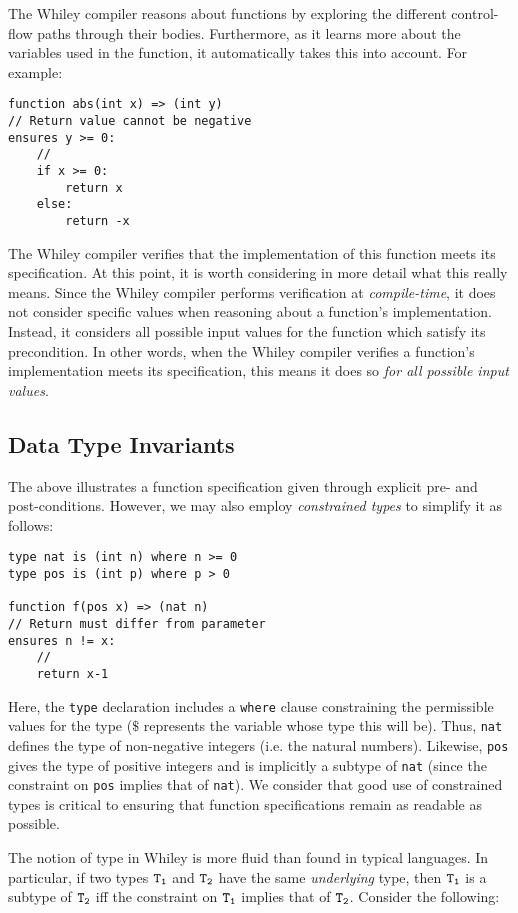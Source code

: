 The Whiley compiler reasons about functions by exploring the different
control-flow paths through their bodies.  Furthermore, as it learns
more about the variables used in the function, it automatically takes
this into account.  For example:
\begin{lstlisting}
function abs(int x) => (int y)
// Return value cannot be negative
ensures y >= 0:
    //
    if x >= 0:
        return x
    else:
        return -x
\end{lstlisting}
The Whiley compiler verifies that the implementation of this function
meets its specification.  At this point, it is worth considering in
more detail what this really means.  Since the Whiley compiler
performs verification at {\em compile-time}, it does not consider
specific values when reasoning about a function's implementation.
Instead, it considers all possible input values for the function which
satisfy its precondition.  In other words, when the Whiley compiler
verifies a function's implementation meets its specification, this
means it does so {\em for all possible input values}.  

\subsection{Data Type Invariants}

The above illustrates a function specification given through explicit pre- and
post-conditions.  However, we may also employ {\em constrained types}
to simplify it as follows:

\begin{lstlisting}
type nat is (int n) where n >= 0
type pos is (int p) where p > 0

function f(pos x) => (nat n)
// Return must differ from parameter
ensures n != x:
    //
    return x-1
\end{lstlisting}

Here, the \lstinline{type} declaration includes a \lstinline{where}
clause constraining the permissible values for the type ($\$$
represents the variable whose type this will be).  Thus,
\lstinline{nat} defines the type of non-negative integers (i.e. the
natural numbers).  Likewise, \lstinline{pos} gives the type of
positive integers and is implicitly a subtype of \lstinline{nat}
(since the constraint on \lstinline{pos} implies that of
\lstinline{nat}).  We consider that good use of constrained types is
critical to ensuring that function specifications remain as readable
as possible.

The notion of type in Whiley is more fluid than found in typical
languages.  In particular, if two types ${\tt T_1}$ and ${\tt T_2}$
have the same {\em underlying} type, then ${\tt T_1}$ is a subtype of
${\tt T_2}$ iff the constraint on ${\tt T_1}$ implies that of ${\tt
  T_2}$.  Consider the following:

